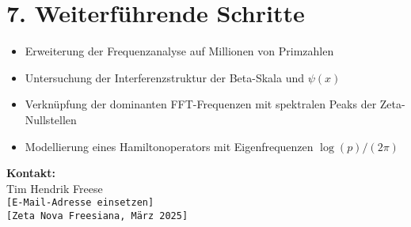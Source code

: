 \documentclass[12pt]{article}
\begin{document}
\section*{7. Weiterführende Schritte}

\begin{itemize}
  \item Erweiterung der Frequenzanalyse auf Millionen von Primzahlen
  \item Untersuchung der Interferenzstruktur der Beta-Skala und \(\psi(x)\)
  \item Verknüpfung der dominanten FFT-Frequenzen mit spektralen Peaks der Zeta-Nullstellen
  \item Modellierung eines Hamiltonoperators mit Eigenfrequenzen \(\log(p)/(2\pi)\)
\end{itemize}

\bigskip

\noindent\textbf{Kontakt:}\\
Tim Hendrik Freese\\
\texttt{[E-Mail-Adresse einsetzen]}\\
\texttt{[Zeta Nova Freesiana, März 2025]}
\end{document}
